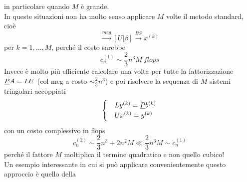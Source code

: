 in particolare quando $M$ è grande.\\
In queste situazioni non ha molto senso applicare $M$ volte il metodo standard, cioè
\begin{equation*}
    [A|b] \overset{meg}{\longrightarrow} [U|\beta] \overset{BS}{\longrightarrow} x^{(k)}
\end{equation*}
per $k=1,...,M$, perché il costo sarebbe
\begin{equation*}
    c_n^{(1)} \sim \frac{2}{3}n^3M \ flops
\end{equation*}
Invece è molto più efficiente calcolare una volta per tutte la fattorizzazione $\uline{P}A=LU$ (col meg a costo $\sim \frac{2}{3}n^3$) e poi risolvere la sequenza di $M$ sistemi tringolari accoppiati
\begin{equation*}
    \begin{cases}
        & Ly^{(k)} = \uline{P}b^{(k)} \\
        & Ux^{(k)} = y^{(k)}
    \end{cases}
\end{equation*}
con un costo complessivo in flops
\begin{equation*}
    c_n^{(2)} \sim \frac{2}{3}n^3 + 2n^2M \ll \frac{2}{3}n^3M \sim c_n^{(1)}
\end{equation*}
perché il fattore $M$ moltiplica il termine quadratico e non quello cubico!\\
Un esempio interessante in cui si può applicare convenientemente questo approccio è quello della

